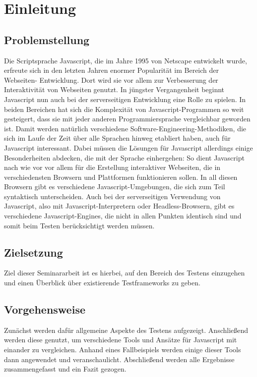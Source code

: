 \section{Einleitung}

\subsection{Problemstellung}
Die Scriptsprache Javascript, die im Jahre 1995 von Netscape entwickelt wurde, erfreute sich in den letzten Jahren enormer Popularität im Bereich der Webseiten- Entwicklung. Dort wird sie vor allem zur Verbesserung der Interaktivität von Webseiten genutzt. In jüngster Vergangenheit beginnt Javascript nun auch bei der serverseitigen Entwicklung eine Rolle zu spielen. In beiden Bereichen hat sich die Komplexität von Javascript-Programmen so weit gesteigert, dass sie mit jeder anderen Programmiersprache vergleichbar geworden ist. Damit werden natürlich verschiedene Software-Engineering-Methodiken, die sich im Laufe der Zeit über alle Sprachen hinweg etabliert haben, auch für Javascript interessant. Dabei müssen die Lösungen für Javascript allerdings einige Besonderheiten abdecken, die mit der Sprache einhergehen: So dient Javascript nach wie vor vor allem für die Erstellung interaktiver Webseiten, die in verschiedensten Browsern und Plattformen funktionieren sollen. In all diesen Browsern gibt es verschiedene Javascript-Umgebungen, die sich zum Teil syntaktisch unterscheiden. Auch bei der serverseitigen Verwendung von Javascript, also mit Javascript-Interpretern oder Headless-Browsern, gibt es verschiedene Javascript-Engines, die nicht in allen Punkten identisch sind und somit beim Testen berücksichtigt werden müssen.

\subsection{Zielsetzung}
Ziel dieser Seminararbeit ist es hierbei, auf den Bereich des Testens einzugehen und einen Überblick über existierende Testframeworks zu geben.

\subsection{Vorgehensweise}
Zunächst werden dafür allgemeine Aspekte des Testens aufgezeigt. Anschließend werden diese genutzt, um verschiedene Tools und Ansätze für Javascript mit einander zu vergleichen. Anhand eines Fallbeispiels werden einige dieser Tools dann angewendet und veranschaulicht. Abschließend werden alle Ergebnisse zusammengefasst und ein Fazit gezogen.

